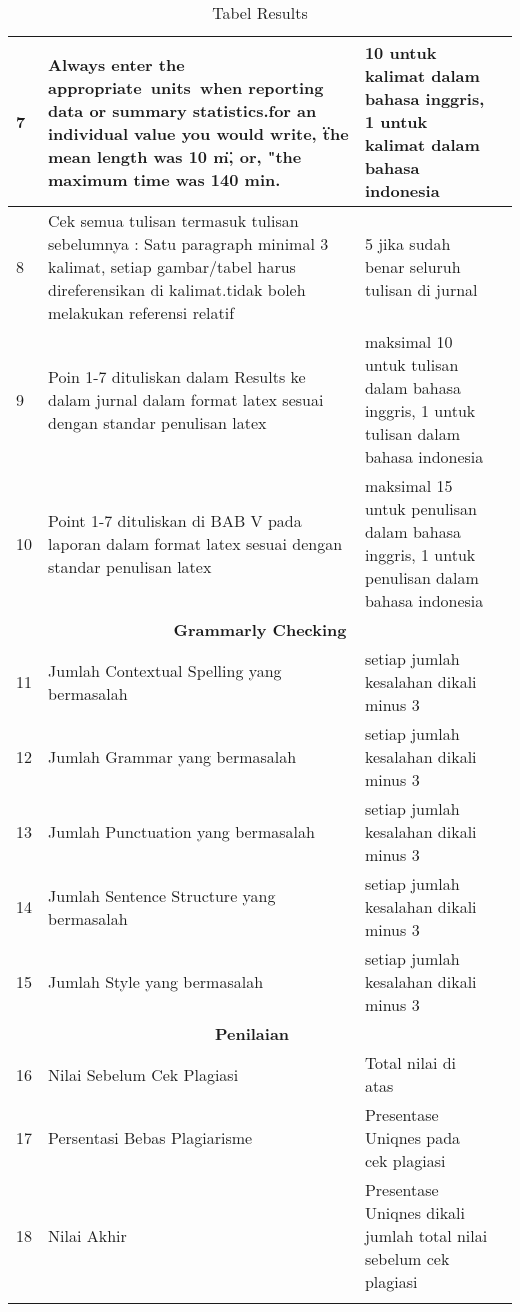 \begin{longtable}{|p{}|p{}|p{}|p{}|}
7 &Always enter the appropriate units when reporting data or summary statistics.for an individual value you would write, \"the mean length was 10 m\", or, "the maximum time was 140 min. & 10 untuk kalimat dalam bahasa inggris, 1 untuk kalimat dalam bahasa indonesia& \\ \hline

8 &Cek semua tulisan termasuk tulisan sebelumnya : Satu paragraph minimal 3 kalimat, setiap gambar/tabel harus direferensikan di kalimat.tidak boleh melakukan referensi relatif & 5 jika sudah benar seluruh tulisan di jurnal & \\ \hline

9 &Poin 1-7 dituliskan dalam Results ke dalam jurnal dalam format latex sesuai dengan standar penulisan latex & maksimal 10 untuk tulisan dalam bahasa inggris, 1 untuk tulisan dalam bahasa indonesia & \\ \hline

10 &Point 1-7 dituliskan di BAB V pada laporan dalam format latex sesuai dengan standar penulisan latex & maksimal 15 untuk penulisan dalam bahasa inggris, 1 untuk penulisan dalam bahasa indonesia & \\ \hline


\multicolumn{4}{c}{\textbf{Grammarly Checking}}\\ \hline

11 &Jumlah Contextual Spelling yang bermasalah&setiap jumlah kesalahan dikali minus 3& \\ \hline

12 &Jumlah Grammar yang bermasalah&setiap jumlah kesalahan dikali minus 3& \\ \hline

13 &Jumlah Punctuation yang bermasalah&setiap jumlah kesalahan dikali minus 3& \\ \hline

14 &Jumlah Sentence Structure yang bermasalah&setiap jumlah kesalahan dikali minus 3& \\ \hline

15 &Jumlah Style yang bermasalah&setiap jumlah kesalahan dikali minus 3& \\ \hline

\multicolumn{3}{c}{\textbf{Penilaian}}\\ \hline

16 &Nilai Sebelum Cek Plagiasi&Total nilai di atas& \\ \hline

17 &Persentasi Bebas Plagiarisme&Presentase Uniqnes pada cek plagiasi& \\ \hline

18 &Nilai Akhir&Presentase Uniqnes dikali jumlah total nilai sebelum cek plagiasi& \\ \hline

\caption{Tabel Results}
\label{table:results}
\end{longtable}




